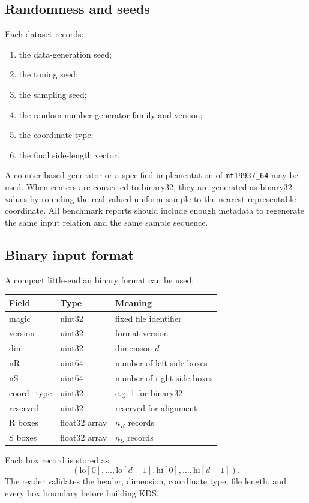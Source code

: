 \documentclass[11pt]{article}
\theoremstyle{definition}
\theoremstyle{plain}
\theoremstyle{remark}
\newcommand{\lo}{\mathrm{lo}}
\newcommand{\hi}{\mathrm{hi}}
\begin{document}
\subsection{Randomness and seeds}

Each dataset records:
\begin{enumerate}[leftmargin=2em]
  \item the data-generation seed;
  \item the tuning seed;
  \item the sampling seed;
  \item the random-number generator family and version;
  \item the coordinate type;
  \item the final side-length vector.
\end{enumerate}
A counter-based generator or a specified implementation of \texttt{mt19937\_64} may be used.
When centers are converted to binary32, they are generated as binary32 values by rounding the
real-valued uniform sample to the nearest representable coordinate.  All benchmark reports
should include enough metadata to regenerate the same input relation and the same sample
sequence.

\subsection{Binary input format}

A compact little-endian binary format can be used:
\begin{center}
\begin{tabular}{lll}
\toprule
Field & Type & Meaning \\
\midrule
magic & uint32 & fixed file identifier \\
version & uint32 & format version \\
dim & uint32 & dimension $d$ \\
nR & uint64 & number of left-side boxes \\
nS & uint64 & number of right-side boxes \\
coord\_type & uint32 & e.g. 1 for binary32 \\
reserved & uint32 & reserved for alignment \\
R boxes & float32 array & $n_R$ records \\
S boxes & float32 array & $n_S$ records \\
\bottomrule
\end{tabular}
\end{center}
Each box record is stored as
\[
  (\lo[0],\ldots,\lo[d-1],\hi[0],\ldots,\hi[d-1]).
\]
The reader validates the header, dimension, coordinate type, file length, and every box
boundary before building KDS.
\end{document}
